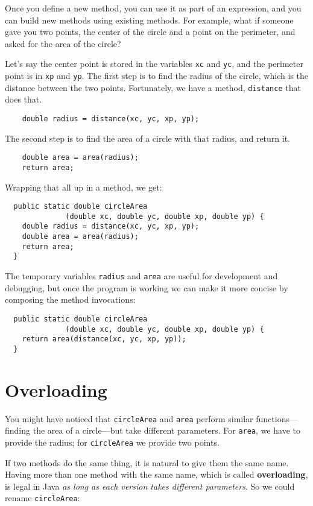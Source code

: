 \documentclass[12pt]{book}
\theoremstyle{definition}
\begin{document}
Once you define a new method,
you can use it as part of an expression, and you can build
new methods using existing methods.  For example, what if someone
gave you two points, the center of the circle and a point on
the perimeter, and asked for the area of the circle?

Let's say the center point is stored in the variables {\tt xc}
and {\tt yc}, and the perimeter point is in {\tt xp} and
{\tt yp}.  The first step is to find the radius of the circle, which
is the distance between the two points.  Fortunately, we have
a method, {\tt distance} that does that.

\begin{lstlisting}
    double radius = distance(xc, yc, xp, yp);
\end{lstlisting}
%
The second step is to find the area of a circle with that
radius, and return it.

\begin{lstlisting}
    double area = area(radius);
    return area;
\end{lstlisting}
%
Wrapping that all up in a method, we get:

\begin{lstlisting}
  public static double circleArea
              (double xc, double yc, double xp, double yp) {
    double radius = distance(xc, yc, xp, yp);
    double area = area(radius);
    return area;
  } 
\end{lstlisting}
%
The temporary variables {\tt radius} and {\tt area} are
useful for development and debugging, but once the program is
working we can make it more concise by composing
the method invocations:

\begin{lstlisting}
  public static double circleArea
              (double xc, double yc, double xp, double yp) {
    return area(distance(xc, yc, xp, yp));
  } 
\end{lstlisting}


\section{Overloading}
\label{overloading}

You might have noticed that {\tt circleArea}
and {\tt area} perform similar functions---finding
the area of a circle---but take different parameters.  For
{\tt area}, we have to provide the radius; for {\tt circleArea}
we provide two points.

If two methods do the same thing, it is natural to give them
the same name.  
Having more than one method with the same name, which is called {\bf
overloading}, is legal in Java {\em as long as each version takes
different parameters}.  So we could rename {\tt circleArea}:
\end{document}
